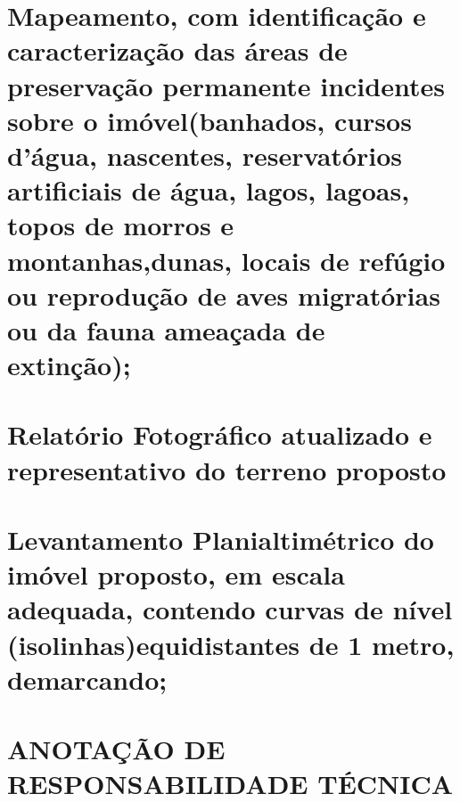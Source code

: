 \chapter{Mapeamento, com identificação e caracterização das áreas de preservação permanente incidentes sobre o imóvel(banhados, cursos d’água, nascentes, reservatórios artificiais de água, lagos, lagoas, topos de morros e montanhas,dunas, locais de refúgio ou reprodução de aves migratórias ou da fauna ameaçada de extinção);}
\chapter{Relatório Fotográfico atualizado e representativo do terreno proposto}
\chapter{Levantamento Planialtimétrico do imóvel proposto, em escala adequada, contendo curvas de nível (isolinhas)equidistantes de 1 metro, demarcando;}
\chapter{ANOTAÇÃO DE RESPONSABILIDADE TÉCNICA}
